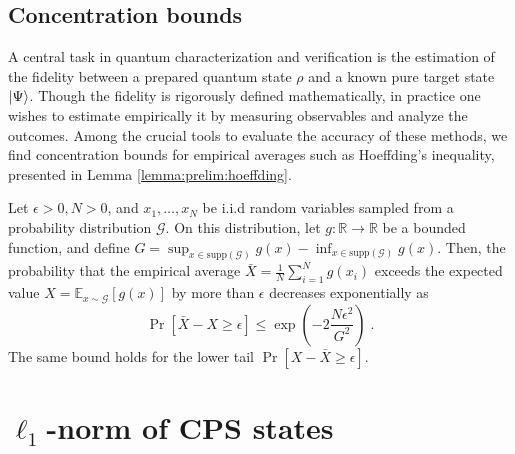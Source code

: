 \documentclass[a4paper,twocolumn,11pt,unpublished]{../../revision/quantumarticle}
\newcommand{\dist}{\mathcal G} %
\begin{document}
\subsection{Concentration bounds}
\label{subsection:prelim:concentration}
A central task in quantum characterization and verification is the estimation of the fidelity between a prepared quantum state $\rho$ and a known pure target state $\ket{\Psi}$. Though the fidelity is rigorously defined mathematically, in practice one wishes to estimate empirically it by measuring observables and analyze the outcomes. Among the crucial tools to evaluate the accuracy of these methods, we find concentration bounds for empirical averages such as Hoeffding's inequality, presented in Lemma \ref{lemma:prelim:hoeffding}.
\begin{lemma}
\label{lemma:prelim:hoeffding}
    Let $\epsilon>0, N>0$, and
    $x_1, \ldots, x_N$ be i.i.d random variables sampled from a probability distribution $\dist$. On this distribution, let $g:\mathbb R \rightarrow \mathbb R$ be a bounded function, and define $G = \sup_{x\in\mathrm{supp}(\dist)}g(x)-\inf_{x\in\mathrm{supp}(\dist)}g(x)$. Then, the probability that the empirical average $\bar X = \frac{1}{N} \sum_{i=1}^N g(x_{i})$ exceeds the expected value $X=\mathbb E_{x\sim\dist}[g(x)]$ by more than $\epsilon$ decreases exponentially as
    \begin{equation}
        \Pr\left[
        \bar X
        -
        X
        \geq \epsilon
        \right]
        \leq
        \exp{
        \left(
        -2\dfrac{N\epsilon^2}{G^2}
        \right)
        }\; .
    \end{equation}
    The same bound holds for the lower tail $\Pr[X - \bar X \geq \epsilon]$.
\end{lemma}



\section{$\ell_1$-norm of CPS states}
\label{appendix:l-1 norm of CPS}
\end{document}
